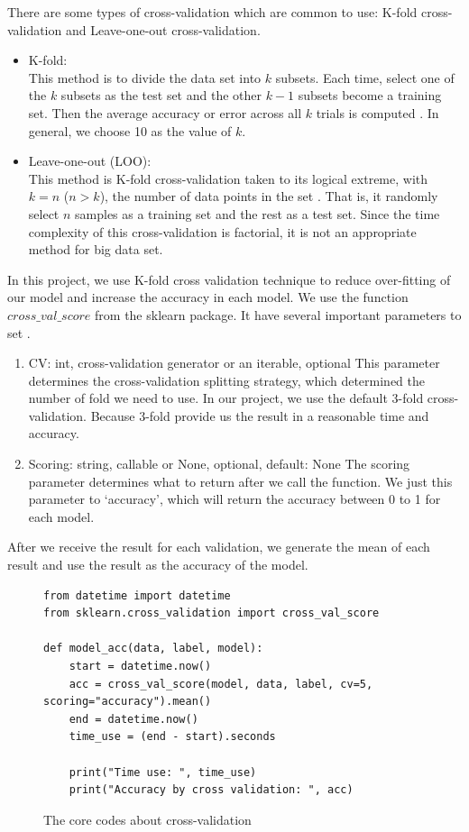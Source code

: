 \documentclass[sigconf]{acmart}
\begin{document}
There are some types of cross-validation which are common to use: K-fold cross-validation and Leave-one-out cross-validation.
\begin{itemize}
    \item K-fold: \\
    This method is to divide the data set into $k$ subsets. Each time, select one of the $k$ subsets as the test set and the other $k-1$ subsets become a training set. Then the average accuracy or error across all $k$ trials is computed \cite{10f.cv}. In general, we choose 10 as the value of $k$. 
    \item Leave-one-out (LOO): \\
    This method is K-fold cross-validation taken to its logical extreme, with $k=n$ ($n>k$), the number of data points in the set \cite{10f.cv}. That is, it randomly select $n$ samples as a training set and the rest as a test set. Since the time complexity of this cross-validation is factorial, it is not an appropriate method for big data set.
\end{itemize}

In this project, we use K-fold cross validation technique to reduce over-fitting of our model and increase the accuracy in each model. We use the function $cross\_val\_score$ from the sklearn package. It have several important parameters to set \cite{sklearn.cv}.

\begin{enumerate}
    \item CV: int, cross-validation generator or an iterable, optional
    This parameter determines the cross-validation splitting strategy, which determined the number of fold we need to use. In our project, we use the default 3-fold cross-validation. Because 3-fold provide us the result in a reasonable time and accuracy.
    \item Scoring: string, callable or None, optional, default: None
    The scoring parameter determines what to return after we call the function. We just this parameter to `accuracy', which will return the accuracy between 0 to 1 for each model.
\end{enumerate}

After we receive the result for each validation, we generate the mean of each result and use the result as the accuracy of the model.

\begin{figure}[htb]
\centering
\begin{lstlisting}
from datetime import datetime
from sklearn.cross_validation import cross_val_score

def model_acc(data, label, model):
    start = datetime.now()
    acc = cross_val_score(model, data, label, cv=5, scoring="accuracy").mean()
    end = datetime.now()
    time_use = (end - start).seconds
    
    print("Time use: ", time_use)
    print("Accuracy by cross validation: ", acc)
\end{lstlisting}
\caption{The core codes about cross-validation}\label{fig:cv}
\end{figure}
\end{document}
